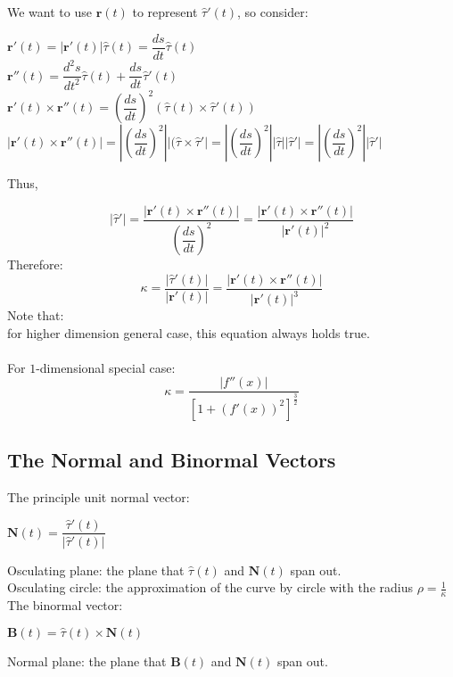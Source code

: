 \documentclass[UTF8,a4paper, 10pt, openany]{svmono}
\begin{document}
We want to use $\mathbf{r}(t)$ to represent $\hat{\tau}'(t)$, so consider:

\begin{center}
$\mathbf{r}'(t)=|\mathbf{r}'(t)|\hat{\tau}(t)=\dfrac{ds}{dt}\hat{\tau}(t)$\\
$\mathbf{r}''(t)=\dfrac{d^2s}{dt^2}\hat{\tau}(t)+\dfrac{ds}{dt}\hat{\tau}'(t)$\\
$\mathbf{r}'(t)\times \mathbf{r}''(t)=(\dfrac{ds}{dt})^2(\hat{\tau}(t)\times \hat{\tau}'(t))$\\
$|\mathbf{r}'(t)\times \mathbf{r}''(t)|=|(\dfrac{ds}{dt})^2||(\hat{\tau}\times \hat{\tau}'|=|(\dfrac{ds}{dt})^2||\hat{\tau}||\hat{\tau}'|=|(\dfrac{ds}{dt})^2||\hat{\tau}'|$
\end{center}

Thus,

\begin{equation}
\boxed{|\hat{\tau}'|=\dfrac{|\mathbf{r}'(t)\times \mathbf{r}''(t)|}{(\dfrac{ds}{dt})^2}=\dfrac{|\mathbf{r}'(t)\times \mathbf{r}''(t)|}{|\mathbf{r}'(t)|^2}}
\end{equation}
Therefore:
\begin{equation}
\boxed{\kappa=\dfrac{|\hat{\tau}'(t)|}{|\mathbf{r}'(t)|}=\dfrac{|\mathbf{r}'(t)\times \mathbf{r}''(t)|}{|\mathbf{r}'(t)|^3}}
\end{equation}
Note that:\\
for higher dimension general case, this equation always holds true.\\ \\
For $1$-dimensional special case:
\begin{equation}
\boxed{\kappa=\dfrac{|f''(x)|}{[1+(f'(x))^2]^{\frac{3}{2}}}}
\end{equation}
\subsection{The Normal and Binormal Vectors}
The principle unit normal vector:
\begin{center}
$\mathbf{N}(t)=\dfrac{\hat{\tau}'(t)}{|\hat{\tau}'(t)|}$
\end{center}
Osculating plane: the plane that $\hat{\tau}(t)$ and $\mathbf{N}(t)$ span out.\\
Osculating circle: the approximation of the curve by circle with the radius $\rho = \frac{1}{\kappa}$\\
The binormal vector:
\begin{center}
$\mathbf{B}(t)=\hat{\tau}(t)\times \mathbf{N}(t)$
\end{center}
Normal plane: the plane that $\mathbf{B}(t)$ and $\mathbf{N}(t)$ span out.
\end{document}
